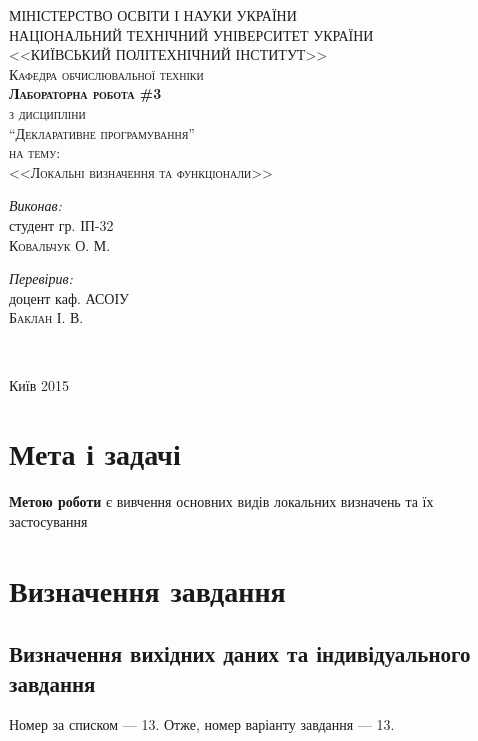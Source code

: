 \documentclass[a4paper, 12pt]{extarticle}
\begin{document}
\begin{titlepage}
  \thispagestyle{empty}
  \center
  \textsc{\uppercase{Міністерство освіти і науки України\\Національний технічний університет України\\<<Київський політехнічний інститут>>}}\\[1cm]
  \textsc{Кафедра обчислювальної техніки}\\[0.5cm]
  \vfill
  \textsc{\Large \textbf{Лабораторна робота \#3}}\\
  \textsc{з дисципліни}\\
  \textsc{\large ``Декларативне програмування''}\\
  \textsc{на тему:}\\
  \textsc{\Large <<Локальні визначення та функціонали>>}\\
  \vspace{3cm}
  \begin{minipage}{0.4\textwidth}
    \begin{flushleft} \large
      \emph{Виконав:}\\
      студент гр. ІП-32 \\
      \textsc{Ковальчук О. М.} %
    \end{flushleft}
  \end{minipage}
  \begin{minipage}{0.4\textwidth}
    \begin{flushright} \large
      \emph{Перевірив:} \\
      доцент каф. АСОІУ \\
      \textsc{Баклан І. В.} %
    \end{flushright}
  \end{minipage}\\[4cm]
  \vfill

  Київ 2015
\end{titlepage}
\setcounter{page}{2}
\section{Мета і задачі}
\textbf{Метою роботи} є вивчення основних видів локальних визначень та їх застосування
\section{Визначення завдання}
\subsection{Визначення вихідних даних та індивідуального завдання}
Номер за списком --- 13. Отже, номер варіанту завдання --- 13.
\end{document}
